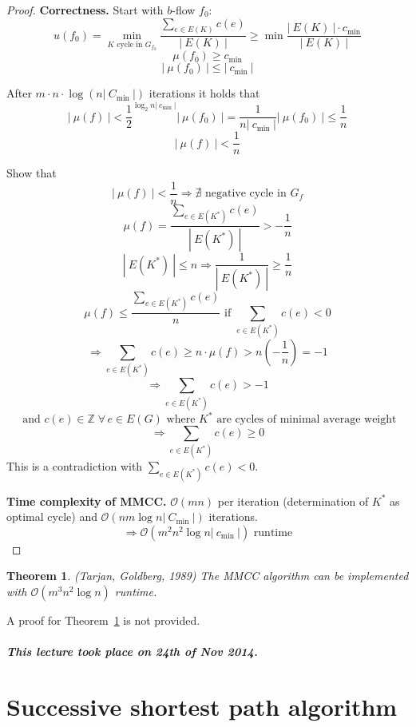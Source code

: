 \documentclass{article}
\newtheorem{theorem}{Theorem}
\newcommand{\card}[1]{\left|\:\!#1\:\!\right|}
\newcommand{\dateref}[1]{\paragraph{\textit{This lecture took place on #1.}}}
\newcommand{\fall}{\;\forall\,}
\newcommand{\noproof}[1]{A proof for Theorem~\ref{#1} is not provided.}
\begin{document}
\begin{proof}
  \textbf{Correctness.}
  Start with $b$-flow $f_0$:
  \[
    u(f_0) = \min_{K \text{ cycle in } G_{f_0}} \frac{\sum_{e \in E(K)} c(e)}{\card{E(K)}}
      \geq \min\frac{\card{E(K)} \cdot c_{\text{min}}}{\card{E(K)}}
  \] \[
    \mu(f_0) \geq c_{\text{min}}
  \] \[
    \card{\mu(f_0)} \leq \card{c_{\text{min}}}
  \]

  After $m\cdot n\cdot \log(n\card{C_{\text{min}}})$ iterations it holds that
  \[
    \card{\mu(f)}
      < {\frac12}^{\log_2{n\card{c_{\text{min}}}}} \card{\mu(f_0)}
      = \frac{1}{n\card{c_{\text{min}}}} \card{\mu(f_0)} \leq \frac1{n}
  \] \[
    \card{\mu(f)} < \frac1{n}
  \]

  Show that
  \[
    \card{\mu(f)} < \frac1{n} \Rightarrow \nexists \text{ negative cycle in } G_f
  \] \[
    \mu(f) = \frac{\sum_{e \in E(K^*)} c(e)}{\card{E(K^*)}} > -\frac1n
  \] \[
    \card{E(K^*)} \leq n \Rightarrow \frac{1}{\card{E(K^*)}} \geq \frac1n
  \] \[
    \mu(f) \leq \frac{\sum_{e \in E(K^*)} c(e)}{n}
      \text{ if } \sum_{e \in E(K^*)} c(e) < 0
  \] \[
    \Rightarrow \sum_{e \in E(K^*)} c(e)
      \geq n \cdot \mu(f)
      > n \left(-\frac1n\right) = -1
  \] \[
    \Rightarrow \sum_{e \in E(K^*)} c(e) > -1
  \] \[
    \text{ and } c(e) \in \mathbb{Z} \fall e \in E(G)
      \text{ where $K^*$ are cycles of minimal average weight}
  \] \[
    \Rightarrow \sum_{e \in E(K^*)} c(e) \geq 0
  \]
  This is a contradiction with $\sum_{e \in E(K^*)} c(e) < 0$.

  \textbf{Time complexity of MMCC.}
    $\mathcal{O}(mn)$ per iteration (determination of $K^*$ as optimal cycle)
    and $\mathcal{O}(nm\log{n} \card{C_{\text{min}}})$ iterations.
    \[ \Rightarrow \mathcal{O}(m^2 n^2 \log{n \card{c_{\text{min}}}}) \text{ runtime} \]
\end{proof}

\begin{theorem}\label{satz-5.7}
  (Tarjan, Goldberg, 1989)
  The MMCC algorithm can be implemented with $\mathcal{O}(m^3 n^2 \log{n})$ runtime.
\end{theorem}

\noproof{satz-5.7}

\dateref{24th of Nov 2014}

\section{Successive shortest path algorithm}
\end{document}
